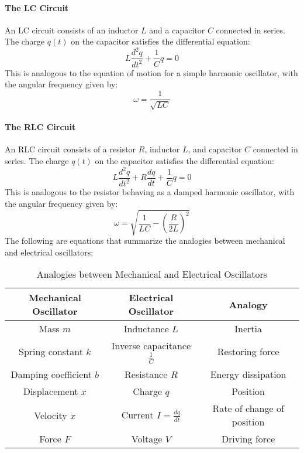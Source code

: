 \documentclass[11pt]{report}
\begin{document}
\paragraph{The LC Circuit} An LC circuit consists of an inductor \( L \) and a capacitor \( C \) connected in series. The charge \( q(t) \) on the capacitor satisfies the differential equation:
\begin{equation}
    L\frac{d^2q}{dt^2} + \frac{1}{C}q = 0
\end{equation}
This is analogous to the equation of motion for a simple harmonic oscillator, with the angular frequency given by:
\begin{equation}
    \omega = \frac{1}{\sqrt{LC}}
\end{equation}  

\paragraph{The RLC Circuit} An RLC circuit consists of a resistor \( R \), inductor \( L \), and capacitor \( C \) connected in series. The charge \( q(t) \) on the capacitor satisfies the differential equation:
\begin{equation}
    L\frac{d^2q}{dt^2} + R\frac{dq}{dt} + \frac{1}{C}q = 0
\end{equation}
This is analogous to the resistor behaving as a damped harmonic oscillator, with the angular frequency given by:
\begin{equation}
    \omega = \sqrt{\frac{1}{LC} - \left(\frac{R}{2L}\right)^2}
\end{equation}
The following are equations that summarize the analogies between mechanical and electrical oscillators:
\begin{table}[h!]
    \centering
    \begin{tabular}{|c|c|c|}
        \hline
        \textbf{Mechanical Oscillator} & \textbf{Electrical Oscillator} & \textbf{Analogy} \\
        \hline
        Mass \( m \) & Inductance \( L \) & Inertia \\
        Spring constant \( k \) & Inverse capacitance \( \frac{1}{C} \) & Restoring force \\
        Damping coefficient \( b \) & Resistance \( R \) & Energy dissipation \\
        Displacement \( x \) & Charge \( q \) & Position \\
        Velocity \( \dot{x} \) & Current \( I = \frac{dq}{dt} \) & Rate of change of position \\
        Force \( F \) & Voltage \( V \) & Driving force \\
        \hline
    \end{tabular}
    \caption{Analogies between Mechanical and Electrical Oscillators}
    \label{tab:oscillator_analogies}
\end{table}
\end{document}
